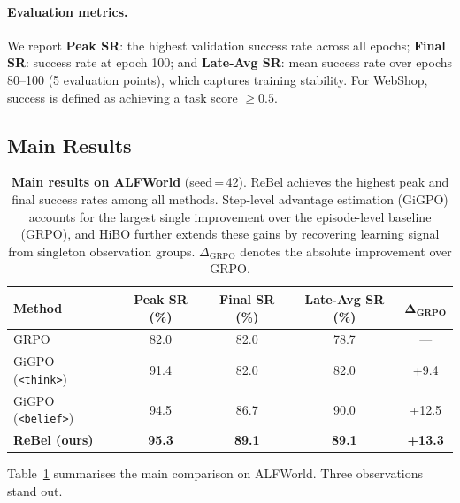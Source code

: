\paragraph{Evaluation metrics.}
We report \textbf{Peak SR}: the highest validation success rate across all epochs;
\textbf{Final SR}: success rate at epoch 100;
and \textbf{Late-Avg SR}: mean success rate over epochs 80--100 (5 evaluation points),
which captures training stability.
For WebShop, success is defined as achieving a task score $\geq 0.5$.


\subsection{Main Results}
\label{sec:main_results}

\begin{table}[t]
  \centering
  \caption{%
    \textbf{Main results on ALFWorld} (seed\,=\,42).
    ReBel achieves the highest peak and final success rates among all methods.
    Step-level advantage estimation (GiGPO) accounts for the largest single
    improvement over the episode-level baseline (GRPO), and HiBO further extends
    these gains by recovering learning signal from singleton observation groups.
    $\Delta_{\text{GRPO}}$ denotes the absolute improvement over GRPO.
  }
  \label{tab:main_results}
  \vspace{4pt}
  \small
  \renewcommand{\arraystretch}{1.15}
  \begin{tabular}{@{}l c c c c@{}}
    \toprule
    \textbf{Method}
      & \textbf{Peak SR (\%)}
      & \textbf{Final SR (\%)}
      & \textbf{Late-Avg SR (\%)}
      & $\boldsymbol{\Delta}_{\textbf{GRPO}}$ \\
    \midrule
    GRPO
      & 82.0 & 82.0 & 78.7 & --- \\
    GiGPO (\texttt{<think>})
      & 91.4 & 82.0 & 82.0 & +9.4 \\
    GiGPO (\texttt{<belief>})
      & 94.5 & 86.7 & 90.0 & +12.5 \\
    \textbf{ReBel (ours)}
      & \textbf{95.3} & \textbf{89.1} & \textbf{89.1} & \textbf{+13.3} \\
    \bottomrule
  \end{tabular}
\end{table}

Table~\ref{tab:main_results} summarises the main comparison on ALFWorld.
Three observations stand out.


